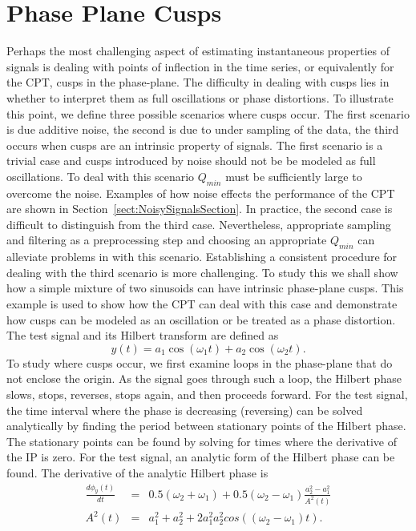 \documentclass[11pt,draftcls,onecolumn]{IEEEtran}
\begin{document}
\section{Phase Plane Cusps}\label{sect:PhasePlaneCuspsSection}
Perhaps the most challenging aspect of estimating instantaneous properties of signals is dealing with points of inflection in the time series, or equivalently for the CPT, cusps in the phase-plane. The difficulty in dealing with cusps lies in whether to interpret them as full oscillations or phase distortions. To illustrate this point, we define three possible scenarios where cusps occur. The first scenario is due additive noise, the second is due to under sampling of the data, the third occurs when cusps are an intrinsic property of signals. The first scenario is a trivial case and cusps introduced by noise should not be be modeled as full oscillations. To deal with this scenario $Q_{min}$ must be sufficiently large to overcome the noise. Examples of how noise effects the performance of the CPT are shown in Section~\ref{sect:NoisySignalsSection}. In practice, the second case is difficult to distinguish from the third case. Nevertheless, appropriate sampling and filtering as a preprocessing step and choosing an appropriate $Q_{min}$ can alleviate problems in with this scenario. Establishing a consistent procedure for dealing with the third scenario is more challenging. To study this we shall show how a simple mixture of two sinusoids can have intrinsic phase-plane cusps. This example is used to show how the CPT can deal with this case and demonstrate how cusps can be modeled as an oscillation or be treated as a phase distortion. The test signal and its Hilbert transform are defined as
\begin{equation}\label{SamplingSigDef}
    y\left( t \right) = {a_1}\cos \left( {{\omega _1}t} \right) + {a_2}\cos \left( {{\omega _2}t} \right).
\end{equation}   
To study where cusps occur, we first examine loops in the phase-plane that do not enclose the origin. As the signal goes through such a loop, the Hilbert phase slows, stops, reverses, stops again, and then proceeds forward. For the test signal, the time interval where the phase is decreasing (reversing) can be solved analytically by finding the period between stationary points of the Hilbert phase. The stationary points can be found by solving for times where the derivative of the IP is zero. For the test signal, an analytic form of the Hilbert phase can be found. The derivative of the analytic Hilbert phase is 
\begin{eqnarray}
    \frac{d\phi_y(t)}{dt}&=&0.5(\omega_2 + \omega_1) + 0.5(\omega_2 - \omega_1)\frac{a_2^2-a_1^2}{A^2(t)} \\
    A^2(t) &=& a_1^2 + a_2^2 + 2a_1^2a_2^2cos((\omega_2-\omega_1)t).
\end{eqnarray}
\end{document}
